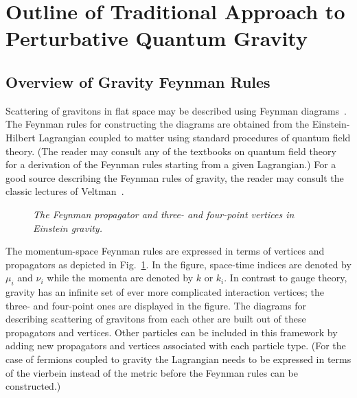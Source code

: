 \section{Outline of Traditional Approach to Perturbative Quantum Gravity}
\label{section:traditional_approach}


\subsection{Overview of Gravity Feynman Rules}
\label{subsection:gravity_rules}

Scattering of gravitons in flat space may be described using Feynman
diagrams~\cite{DeWitt67A,DeWitt67B,VeltmanGravity}.  The Feynman rules
for constructing the diagrams are obtained from the Einstein-Hilbert
Lagrangian coupled to matter using standard procedures of quantum
field theory. (The reader may consult any of the textbooks on quantum
field theory~\cite{Peskin95,Weinberg95} for a derivation of the
Feynman rules starting from a given Lagrangian.) For a good source
describing the Feynman rules of gravity, the reader may consult the
classic lectures of Veltman~\cite{VeltmanGravity}.


\begin{figure}[h]
  \def\epsfsize#1#2{1.0#1}
  \centerline{}
  \caption{\it The Feynman propagator and three- and 
   four-point vertices in Einstein gravity.}
  \label{figure:GravityFeynman}
\end{figure}


The momentum-space Feynman rules are expressed in terms of vertices
and propagators as depicted in Fig.~\ref{figure:GravityFeynman}.  In
the figure, space-time indices are denoted by $\mu_i$ and $\nu_i$
while the momenta are denoted by $k$ or $k_i$. In contrast to gauge
theory, gravity has an infinite set of ever more complicated
interaction vertices; the three- and four-point ones are displayed in
the figure.  The diagrams for describing scattering of gravitons from
each other are built out of these propagators and vertices.  Other 
particles can be included in this framework by adding new propagators
and vertices associated with each particle type.
(For the case of fermions coupled to gravity the Lagrangian needs to be
expressed in terms of the vierbein instead of the metric before the
Feynman rules can be constructed.)


